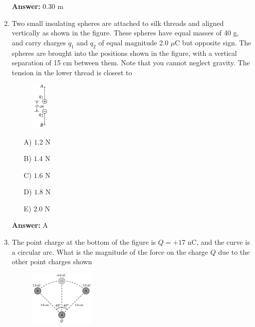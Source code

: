 \begin{enumerate}
    \textbf{Answer:} 0.30 m

    \item Two small insulating spheres are attached to silk threads and aligned vertically as shown in the figure. These spheres have equal masses of 40 g, and carry charges $q_1$ and $q_2$ of equal magnitude 2.0 $\mu$C but opposite sign. The spheres are brought into the positions shown in the figure, with a vertical separation of 15 cm between them. Note that you cannot neglect gravity. The tension in the lower thread is closest to

    \begin{figure}[H]
        \centering
        \includegraphics[width=0.08\textwidth]{figures-workshop01/problem-6.png}
    \end{figure}

    \begin{multicols}{5}
    \begin{itemize}
        \item[A)] $1.2$ N
        \item[B)] $1.4$ N
        \item[C)] $1.6$ N
        \item[D)] $1.8$ N
        \item[E)] $2.0$ N
    \end{itemize}
    \end{multicols}

    \textbf{Answer:} A
    
    \item The point charge at the bottom of the figure is $Q=+17$ nC, and the curve is a circular arc. What is the magnitude of the force on the charge $Q$ due to the other point charges shown

    \begin{figure}[H]
        \centering
        \includegraphics[width=0.3\textwidth]{figures-workshop01/problem-7.png}
    \end{figure}


\end{enumerate}
